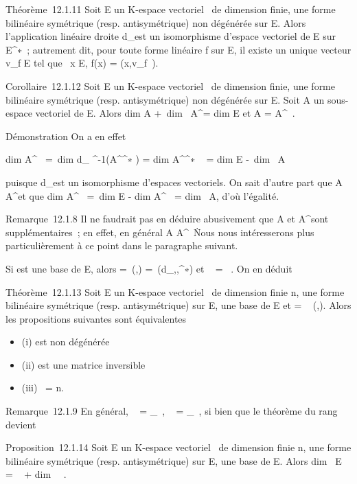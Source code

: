 \documentclass[]{article}
\begin{document}
Théorème~12.1.11 Soit E un K-espace vectoriel ~de dimension finie, \phi une
forme bilinéaire symétrique (resp. antisymétrique) non dégénérée sur E.
Alors l'application linéaire droite d_\phi est un isomorphisme
d'espace vectoriel de E sur E^∗~; autrement dit, pour toute
forme linéaire f sur E, il existe un unique vecteur v_f \in E tel
que \forall~x \in E, f(x) = \phi(x,v_f~).

Corollaire~12.1.12 Soit E un K-espace vectoriel ~de dimension finie, \phi
une forme bilinéaire symétrique (resp. antisymétrique) non dégénérée sur
E. Soit A un sous-espace vectoriel de E. Alors
dim A +\ dim~
A^\bot = dim E et A = A^\bot\bot~.

Démonstration On a en effet

dim A^\bot~ =\
dim d_ \phi^-1(A^\bot^∗ )
= dim A^\bot^∗ ~
= dim E -\ dim~ A

puisque d_\phi est un isomorphisme d'espaces vectoriels. On sait
d'autre part que A \subset~ A^\bot\bot et que
dim A^\bot\bot~ =\
dim E - dim A^\bot~
= dim~ A, d'où l'égalité.

Remarque~12.1.8 Il ne faudrait pas en déduire abusivement que A et
A^\bot sont supplémentaires~; en effet, en général A \bigcap
A^\bot\neq~\0\.
Nous nous intéresserons plus particulièrement à ce point dans le
paragraphe suivant.

Si  est une base de E, alors \Omega =\
\mathrmMat (\phi,) =\
\mathrmMat (d_\phi,,^∗) et
\mathrmrg~\phi
= \mathrmrg~\Omega. On en déduit

Théorème~12.1.13 Soit E un K-espace vectoriel ~de dimension finie n, \phi
une forme bilinéaire symétrique (resp. antisymétrique) sur E,  une base
de E et \Omega = \mathrmMat~
(\phi,). Alors les propositions suivantes sont équivalentes

\begin{itemize}
\itemsep1pt\parskip0pt
\item
  (i) \phi est non dégénérée
\item
  (ii) \Omega est une matrice inversible
\item
  (iii) \mathrmrg~\phi = n.
\end{itemize}

Remarque~12.1.9 En général,
\mathrmKer~\phi
= \mathrmKerd_\phi~,
\mathrmrg~\phi
= \mathrmrgd_\phi~, si
bien que le théorème du rang devient

Proposition~12.1.14 Soit E un K-espace vectoriel ~de dimension finie n,
\phi une forme bilinéaire symétrique (resp. antisymétrique) sur E,  une
base de E. Alors dim~ E
= \mathrmrg~\phi
+ dim~
\mathrmKer~\phi.
\end{document}

